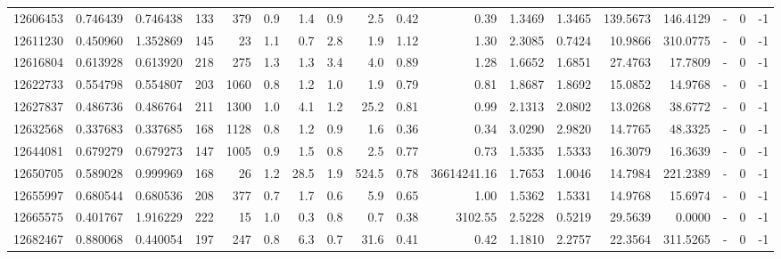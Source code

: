 \begin{tabular}{rrrrrrrrrrrrrrrlrr}
  12606453 & 0.746439 &   0.746438 &  133 &  379 &      0.9 &      1.4 &     0.9 &      2.5 &       0.42 &        0.39 &  1.3469 &  1.3465 &  139.5673 &  146.4129 &             - &        0 &         -1 \\
  12611230 & 0.450960 &   1.352869 &  145 &   23 &      1.1 &      0.7 &     2.8 &      1.9 &       1.12 &        1.30 &  2.3085 &  0.7424 &   10.9866 &  310.0775 &             - &        0 &         -1 \\
  12616804 & 0.613928 &   0.613920 &  218 &  275 &      1.3 &      1.3 &     3.4 &      4.0 &       0.89 &        1.28 &  1.6652 &  1.6851 &   27.4763 &   17.7809 &             - &        0 &         -1 \\
  12622733 & 0.554798 &   0.554807 &  203 & 1060 &      0.8 &      1.2 &     1.0 &      1.9 &       0.79 &        0.81 &  1.8687 &  1.8692 &   15.0852 &   14.9768 &             - &        0 &         -1 \\
  12627837 & 0.486736 &   0.486764 &  211 & 1300 &      1.0 &      4.1 &     1.2 &     25.2 &       0.81 &        0.99 &  2.1313 &  2.0802 &   13.0268 &   38.6772 &             - &        0 &         -1 \\
  12632568 & 0.337683 &   0.337685 &  168 & 1128 &      0.8 &      1.2 &     0.9 &      1.6 &       0.36 &        0.34 &  3.0290 &  2.9820 &   14.7765 &   48.3325 &             - &        0 &         -1 \\
  12644081 & 0.679279 &   0.679273 &  147 & 1005 &      0.9 &      1.5 &     0.8 &      2.5 &       0.77 &        0.73 &  1.5335 &  1.5333 &   16.3079 &   16.3639 &             - &        0 &         -1 \\
  12650705 & 0.589028 &   0.999969 &  168 &   26 &      1.2 &     28.5 &     1.9 &    524.5 &       0.78 & 36614241.16 &  1.7653 &  1.0046 &   14.7984 &  221.2389 &             - &        0 &         -1 \\
  12655997 & 0.680544 &   0.680536 &  208 &  377 &      0.7 &      1.7 &     0.6 &      5.9 &       0.65 &        1.00 &  1.5362 &  1.5331 &   14.9768 &   15.6974 &             - &        0 &         -1 \\
  12665575 & 0.401767 &   1.916229 &  222 &   15 &      1.0 &      0.3 &     0.8 &      0.7 &       0.38 &     3102.55 &  2.5228 &  0.5219 &   29.5639 &    0.0000 &             - &        0 &         -1 \\
  12682467 & 0.880068 &   0.440054 &  197 &  247 &      0.8 &      6.3 &     0.7 &     31.6 &       0.41 &        0.42 &  1.1810 &  2.2757 &   22.3564 &  311.5265 &             - &        0 &         -1 \\

\end{tabular}
